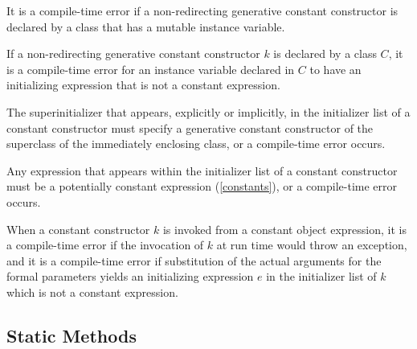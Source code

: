 \documentclass[makeidx]{article}
\begin{document}
\LMHash{}%
It is a compile-time error if a non-redirecting generative constant constructor
is declared by a class that has a mutable instance variable.


\LMHash{}%
If a non-redirecting generative constant constructor $k$
is declared by a class $C$,
it is a compile-time error
for an instance variable declared in $C$
to have an initializing expression that is not a constant expression.


\LMHash{}%
The superinitializer that appears, explicitly or implicitly,
in the initializer list of a constant constructor
must specify a generative constant constructor of
the superclass of the immediately enclosing class,
or a compile-time error occurs.

\LMHash{}%
Any expression that appears within
the initializer list of a constant constructor
must be a potentially constant expression
(\ref{constants}),
or a compile-time error occurs.

\LMHash{}%
When a constant constructor $k$ is invoked from a constant object expression,
it is a compile-time error if
the invocation of $k$ at run time would throw an exception,
and it is a compile-time error if
substitution of the actual arguments for the formal parameters
yields an initializing expression $e$ in the initializer list of $k$
which is not a constant expression.




\subsection{Static Methods}
\end{document}
